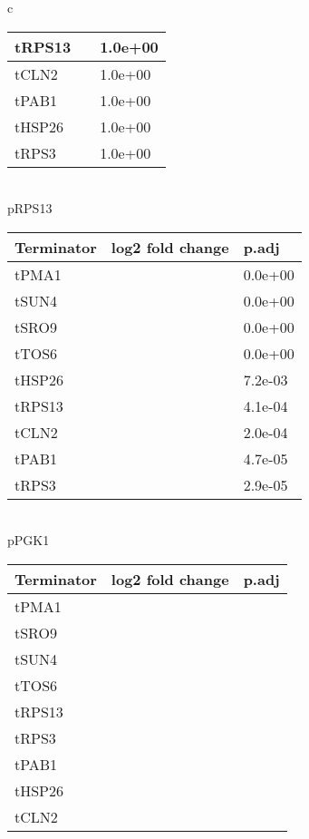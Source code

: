 \documentclass[../main.tex]{subfiles}
\begin{document}
\begin{table}[bh!]
{\begin{tabular}{ c }
\begin{tabularx}{0.8\textwidth} { 
  | >{\centering\arraybackslash}X 
  | >{\centering\arraybackslash}X 
  | >{\centering\arraybackslash}X | }
\hline
tRPS13 & -0.1965647 & 1.0e+00\\
\hline
tCLN2 & -0.1252409 & 1.0e+00\\
\hline
tPAB1 & -0.0616474 & 1.0e+00\\
\hline
tHSP26 & 0.0319040 & 1.0e+00\\
\hline
tRPS3 & 0.1164520 & 1.0e+00\\
\hline
\end{tabularx}\\
pRPS13  \\
\begin{tabularx}{0.8\textwidth} { 
  | >{\centering\arraybackslash}X 
  | >{\centering\arraybackslash}X 
  | >{\centering\arraybackslash}X | }
\hline
\textbf{Terminator} & \textbf{log2 fold change} & \textbf{p.adj}\\
\hline
tPMA1 & -2.0853624 & 0.0e+00\\
\hline
tSUN4 & -1.2491007 & 0.0e+00\\
\hline
tSRO9 & -1.0162570 & 0.0e+00\\
\hline
tTOS6 & -0.9791352 & 0.0e+00\\
\hline
tHSP26 & 0.3061052 & 7.2e-03\\
\hline
tRPS13 & 0.4382561 & 4.1e-04\\
\hline
tCLN2 & 0.4762219 & 2.0e-04\\
\hline
tPAB1 & 0.5324084 & 4.7e-05\\
\hline
tRPS3 & 0.5549583 & 2.9e-05\\
\hline
\end{tabularx} \\
pPGK1  \\
\begin{tabularx}{0.8\textwidth} { 
  | >{\centering\arraybackslash}X 
  | >{\centering\arraybackslash}X 
  | >{\centering\arraybackslash}X | }
\hline
\textbf{Terminator} & \textbf{log2 fold change} & \textbf{p.adj}\\
\hline
tPMA1 & -1.8971163 & 0.00\\
\hline
tSRO9 & -1.3729199 & 0.00\\
\hline
tSUN4 & -1.0917919 & 0.00\\
\hline
tTOS6 & -0.9565605 & 0.00\\
\hline
tRPS13 & -0.2020877 & 0.14\\
\hline
tRPS3 & 0.0381100 & 1.00\\
\hline
tPAB1 & 0.0650108 & 1.00\\
\hline
tHSP26 & 0.0881576 & 1.00\\
\hline
tCLN2 & 0.2156118 & 0.12\\

\end{tabularx}
\end{tabular}}
\end{table}
\end{document}
